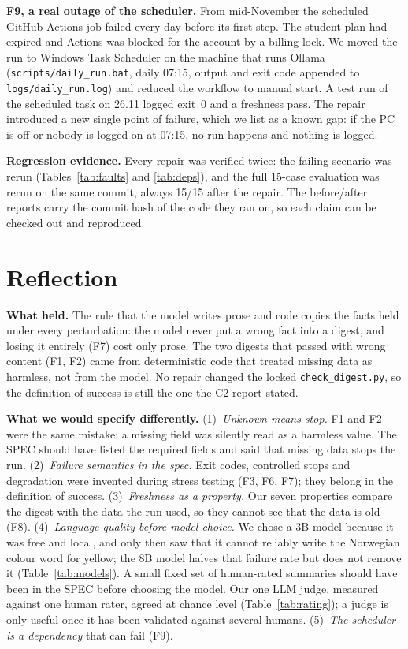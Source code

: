 \documentclass{article}
\newcommand{\code}[1]{\texttt{#1}}
\begin{document}
\textbf{F9, a real outage of the scheduler.} From mid-November the scheduled GitHub Actions job failed every day before its first step. The student plan had expired and Actions was blocked for the account by a billing lock. We moved the run to Windows Task Scheduler on the machine that runs Ollama (\code{scripts/daily\_run.bat}, daily 07:15, output and exit code appended to \code{logs/daily\_run.log}) and reduced the workflow to manual start. A test run of the scheduled task on 26.11 logged exit~0 and a freshness pass. The repair introduced a new single point of failure, which we list as a known gap: if the PC is off or nobody is logged on at 07:15, no run happens and nothing is logged.

\textbf{Regression evidence.} Every repair was verified twice: the failing scenario was rerun (Tables~\ref{tab:faults} and \ref{tab:deps}), and the full 15-case evaluation was rerun on the same commit, always 15/15 after the repair. The before/after reports carry the commit hash of the code they ran on, so each claim can be checked out and reproduced.

\section{Reflection}
\label{sec:reflection}
\textbf{What held.} The rule that the model writes prose and code copies the facts held under every perturbation: the model never put a wrong fact into a digest, and losing it entirely (F7) cost only prose. The two digests that passed with wrong content (F1, F2) came from deterministic code that treated missing data as harmless, not from the model. No repair changed the locked \code{check\_digest.py}, so the definition of success is still the one the C2 report stated.

\textbf{What we would specify differently.} (1)~\emph{Unknown means stop.} F1 and F2 were the same mistake: a missing field was silently read as a harmless value. The SPEC should have listed the required fields and said that missing data stops the run. (2)~\emph{Failure semantics in the spec.} Exit codes, controlled stops and degradation were invented during stress testing (F3, F6, F7); they belong in the definition of success. (3)~\emph{Freshness as a property.} Our seven properties compare the digest with the data the run used, so they cannot see that the data is old (F8). (4)~\emph{Language quality before model choice.} We chose a 3B model because it was free and local, and only then saw that it cannot reliably write the Norwegian colour word for yellow; the 8B model halves that failure rate but does not remove it (Table~\ref{tab:models}). A small fixed set of human-rated summaries should have been in the SPEC before choosing the model. Our one LLM judge, measured against one human rater, agreed at chance level (Table~\ref{tab:rating}); a judge is only useful once it has been validated against several humans. (5)~\emph{The scheduler is a dependency} that can fail (F9).
\end{document}
